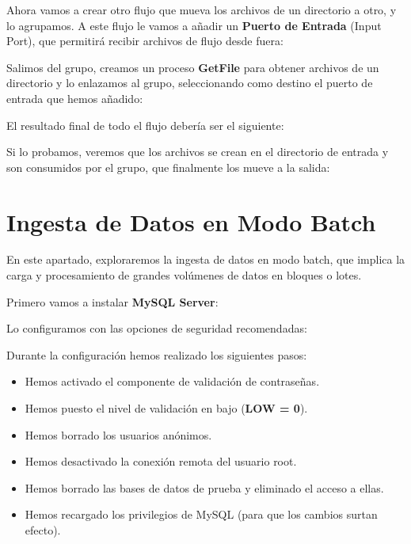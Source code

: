 \documentclass{../../../miPlantilla}
\begin{document}
Ahora vamos a crear otro flujo que mueva los archivos de un directorio a otro, y lo agrupamos. A este flujo le vamos a añadir un \textbf{Puerto de Entrada} (Input Port), que permitirá recibir archivos de flujo desde fuera:


Salimos del grupo, creamos un proceso \textbf{GetFile} para obtener archivos de un directorio y lo enlazamos al grupo, seleccionando como destino el puerto de entrada que hemos añadido:


\newpage

El resultado final de todo el flujo debería ser el siguiente:


Si lo probamos, veremos que los archivos se crean en el directorio de entrada y son consumidos por el grupo, que finalmente los mueve a la salida:


\newpage

\section{Ingesta de Datos en Modo Batch}
En este apartado, exploraremos la ingesta de datos en modo batch, que implica la carga y procesamiento de grandes volúmenes de datos en bloques o lotes.

Primero vamos a instalar \textbf{MySQL Server}:


Lo configuramos con las opciones de seguridad recomendadas:


Durante la configuración hemos realizado los siguientes pasos:
\begin{itemize}
    \item Hemos activado el componente de validación de contraseñas.
    \item Hemos puesto el nivel de validación en bajo (\textbf{LOW = 0}).
    \item Hemos borrado los usuarios anónimos.
    \item Hemos desactivado la conexión remota del usuario root.
    \item Hemos borrado las bases de datos de prueba y eliminado el acceso a ellas.
    \item Hemos recargado los privilegios de MySQL (para que los cambios surtan efecto).
\end{itemize}
\end{document}
